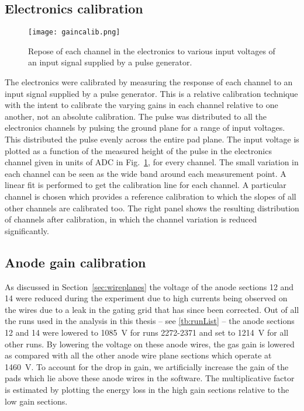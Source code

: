 

\subsection{Electronics calibration}
\label{sec:elecCalib}

\begin{figure}[!htb]
\texttt{[image: gaincalib.png]}
\caption{Repose of each channel in the electronics to various input voltages of an input signal supplied by a pulse generator.}
\label{fig:gaincalib}
\end{figure}

The electronics were calibrated by measuring the response of each channel to an input signal supplied by a pulse generator. This is a relative calibration technique with the intent to calibrate the varying gains in each channel relative to one another, not an absolute calibration. The pulse was distributed to all the electronics channels by pulsing the ground plane for a range of input voltages. This distributed the pulse evenly across the entire pad plane. The input voltage is plotted as a function of the measured height of the pulse in the electronics channel given in units of ADC in Fig.~\ref{fig:gaincalib}, for every channel. The small variation in each channel can be seen as the wide band around each measurement point. A linear fit is performed to get the calibration line for each channel. A particular channel is chosen which provides a reference calibration to which the slopes of all other channels are calibrated too.   The right panel shows the resulting distribution of channels after calibration, in which the channel variation is reduced significantly. 



\subsection{Anode gain calibration}
\label{sec:anodeCalib}
As discussed in Section~\ref{sec:wireplanes} the voltage of the anode sections 12 and 14 were reduced during the experiment due to high currents being observed on the wires due to a leak in the gating grid that has since been corrected. Out of all the runs used in the analysis in this thesis -- see \ref{tb:runList} -- the anode sections 12 and 14 were lowered to \SI{1085}{\volt} for runs 2272-2371 and set to \SI{1214}{\volt} for all other runs. By lowering the voltage on these anode wires, the gas gain is lowered as compared with all the other anode wire plane sections which operate at \SI{1460}{\volt}. To account for the drop in gain, we artificially increase the gain of the pads which lie above these anode wires in the software. The multiplicative factor is estimated by plotting the energy loss in the high gain sections relative to the low gain sections.



